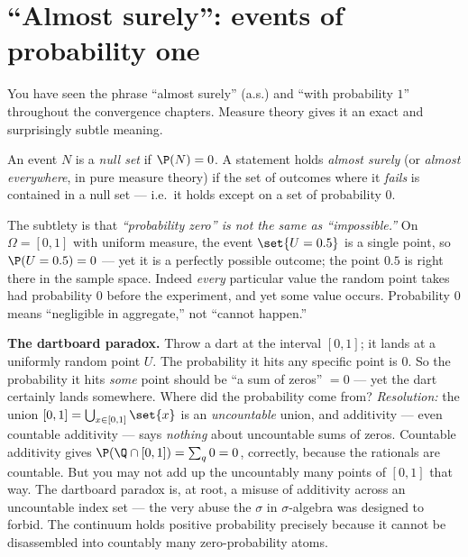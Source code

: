 \section{``Almost surely'': events of probability one}
\label{ch36:almost-surely}

You have seen the phrase ``almost surely'' (a.s.) and ``with probability $1$''
throughout the convergence chapters. Measure theory gives it an exact and
surprisingly subtle meaning.

\begin{definition}
\label{ch36:null}
An event $N$ is a \emph{null set} if $\P(N) = 0$. A statement holds
\emph{almost surely} (or \emph{almost everywhere}, in pure measure theory) if the
set of outcomes where it \emph{fails} is contained in a null set --- i.e.\ it holds
except on a set of probability $0$.
\end{definition}

The subtlety is that \emph{``probability zero'' is not the same as
``impossible.''} On $\Omega = [0,1]$ with uniform measure, the event
$\set{U = 0.5}$ is a single point, so $\P(U = 0.5) = 0$ --- yet it is a perfectly
possible outcome; the point $0.5$ is right there in the sample space. Indeed
\emph{every} particular value the random point takes had probability $0$ before
the experiment, and yet some value occurs. Probability $0$ means
``negligible in aggregate,'' not ``cannot happen.''

\begin{paradoxbox}
\textbf{The dartboard paradox.} Throw a dart at the interval $[0,1]$; it lands at a
uniformly random point $U$. The probability it hits any specific point is $0$. So
the probability it hits \emph{some} point should be ``a sum of zeros''
$=0$ --- yet the dart certainly lands somewhere. Where did the probability come
from? \emph{Resolution:} the union $[0,1] = \bigcup_{x \in [0,1]} \set{x}$ is an
\emph{uncountable} union, and additivity --- even countable additivity --- says
\emph{nothing} about uncountable sums of zeros. Countable additivity gives
$\P(\Q \cap [0,1]) = \sum_{q} 0 = 0$, correctly, because the rationals are
countable. But you may not add up the uncountably many points of $[0,1]$ that way.
The dartboard paradox is, at root, a misuse of additivity across an uncountable
index set --- the very abuse the $\sigma$ in $\sigma$-algebra was designed to
forbid. The continuum holds positive probability precisely because it cannot be
disassembled into countably many zero-probability atoms.
\end{paradoxbox}

